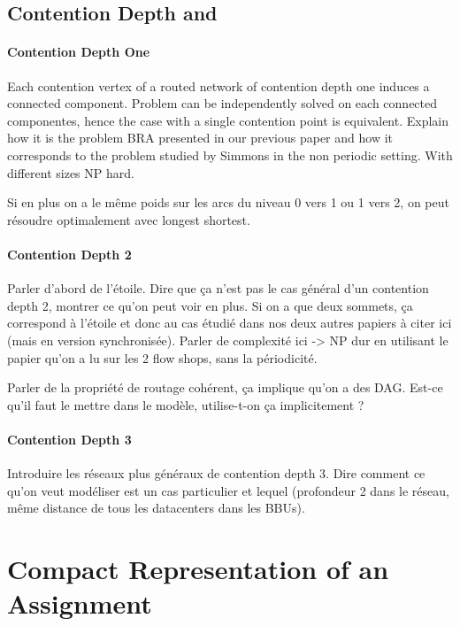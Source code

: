 \documentclass[english]{article}
\begin{document}
\subsection{Contention Depth and \spall}

\paragraph{Contention Depth One}

Each contention vertex of a routed network of contention depth one induces a connected component. 
Problem \spall can be independently solved on each connected componentes, hence the case with a single contention point
is equivalent. 
Explain how it is the problem BRA presented in our previous paper and how it corresponds to the problem studied by Simmons
in the non periodic setting. With different sizes NP hard.

Si en plus on a le même poids sur les arcs du niveau 0 vers 1 ou 1 vers 2, on peut résoudre optimalement avec longest shortest.

\paragraph{Contention Depth 2}

Parler d'abord de l'étoile. Dire que ça n'est pas le cas général d'un contention depth 2, montrer ce qu'on peut voir en plus. Si on a que deux sommets, ça correspond à l'étoile et donc au cas étudié dans nos deux autres papiers à citer ici
(mais en version synchronisée). Parler de complexité ici -> NP dur en utilisant le papier qu'on a lu
sur les 2 flow shops, sans la périodicité.

Parler de la propriété de routage cohérent, ça implique qu'on a des DAG. Est-ce qu'il faut le mettre dans le modèle,
utilise-t-on ça implicitement ?

\paragraph{Contention Depth 3}

Introduire les réseaux plus généraux de contention depth 3.
Dire comment ce qu'on veut modéliser est un cas particulier et lequel (profondeur 2 dans le réseau, même
distance de tous les datacenters dans les BBUs).


\section{Compact Representation of an Assignment}
\end{document}
